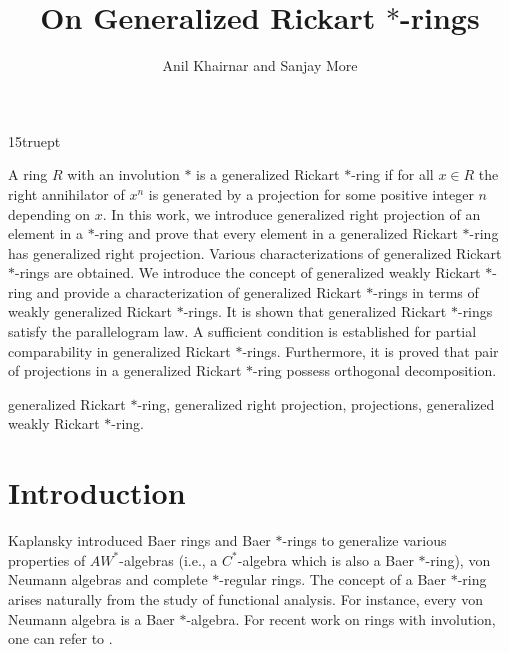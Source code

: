 \documentclass[11pt, one side,emlines]{amsart}
\theoremstyle{definition}
\numberwithin{equation}{section} \thispagestyle{empty} \voffset
\begin{document}
\baselineskip 15truept
\title{ On Generalized Rickart $*$-rings}

\date{}

\author{ Anil Khairnar and Sanjay More }
	 
\address{\rm Department of Mathematics, MES Abasaheb Garware College, Pune-411004, India.}
 
  \address {\rm Department of Mathematics, Prof. Ramkrishna More College, Akurdi, Pune-411044, India.}
 

 
 

 
 {\small 
 A ring $R$ with an involution $*$ is a generalized Rickart $*$-ring if for all $x\in R$
the right annihilator of $x^n$ is generated by a projection for some positive integer $n$
depending on $x$. In this work, we introduce generalized right projection of an element in a $*$-ring and prove that every element in a generalized Rickart $*$-ring has generalized right projection. Various characterizations of generalized Rickart $*$-rings are obtained. We introduce the concept of  generalized weakly Rickart $*$-ring and provide a characterization of generalized Rickart $*$-rings in terms of weakly generalized Rickart $*$-rings. It is shown that generalized Rickart $*$-rings satisfy the parallelogram law. A sufficient condition is established for partial comparability in generalized Rickart $*$-rings. Furthermore, it is proved that pair of projections in a generalized Rickart $*$-ring possess orthogonal decomposition. }

   generalized Rickart $*$-ring, generalized right projection, projections, generalized weakly Rickart $*$-ring.
\section{Introduction} 





\indent   Kaplansky \cite{Kap} introduced Baer rings and Baer $*$-rings to
generalize various properties of $AW^*$-algebras (i.e., a $C^*$-algebra which is also a Baer $*$-ring), von Neumann
algebras and complete $*$-regular rings. The concept of a Baer $*$-ring arises naturally from the study of functional analysis. For instance, every von Neumann algebra is a Baer $*$-algebra. For recent work on rings with involution, one can refer to  \cite{Anil,Anil2,Anil3,Anil4,more1,Tha2}.
\end{document}
